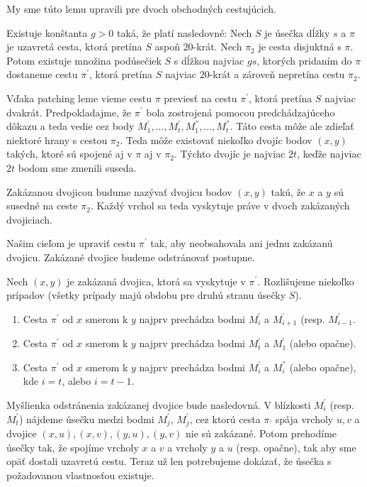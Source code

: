 My sme túto lemu upravili pre dvoch obchodných cestujúcich.

\begin{lema}
Existuje konštanta $g > 0$ taká, že platí nasledovné: Nech $S$ je úsečka dĺžky $s$ a $\pi$ je
uzavretá cesta, ktorá pretína $S$ aspoň $20$-krát. Nech $\pi_2$ je cesta disjuktná s $\pi$.
Potom existuje množina podúsečiek $S$ s dĺžkou najviac
$gs$, ktorých pridaním do $\pi$ dostaneme cestu $\pi^{'}$, ktorá pretína $S$ najviac $20$-krát a
zároveň nepretína cestu $\pi_2$.
\end{lema}

\begin{dokaz}
Vďaka patching leme vieme cestu $\pi$ previesť na cestu $\pi^{'}$, ktorá pretína $S$ najviac
dvakrát. Predpokladajme, že $\pi^{'}$ bola zostrojená pomocou predchádzajúceho dôkazu a teda vedie
cez body $M_1^{'}, \dots, M_t^{'}, M_1^{''}, \dots, M_t^{''}$. Táto cesta môže ale zdieľať niektoré
hrany s cestou $\pi_2$. Teda môže existovať niekoľko dvojíc bodov $(x, y)$ takých, ktoré sú spojené
aj v $\pi$ aj v $\pi_2$. Týchto dvojíc je najviac $2t$, keďže najviac $2t$ bodom sme zmenili suseda. 

Zakázanou dvojicou budume nazývať dvojicu bodov $(x, y)$ takú, že $x$ a $y$ sú susedné na
ceste $\pi_2$. Každý vrchol sa teda vyskytuje práve v dvoch zakázaných dvojiciach.

Našim cieľom je upraviť cestu $\pi^{'}$ tak, aby neobsahovala ani jednu zakázanú dvojicu.
Zakázané dvojice budeme odstránovať postupne.

Nech $(x,y)$ je zakázaná dvojica, ktorá sa vyskytuje v $\pi^{'}$. Rozlišujeme niekoľko prípadov
(všetky prípady majú obdobu pre druhú stranu úsečky $S$).
\begin{enumerate}
\item Cesta $\pi^{'}$ od $x$ smerom k $y$ najprv prechádza bodmi $M_i^{'}$ a $M_{i+1}^{'}$ (resp.
$M_{i-1}^{'}$.
\item Cesta $\pi^{'}$ od $x$ smerom k $y$ najprv prechádza bodmi $M_t^{'}$ a $M_{1}^{'}$ (alebo
opačne).
\item Cesta $\pi^{'}$ od $x$ smerom k $y$ najprv prechádza bodmi $M_i^{'}$ a $M_i^{''}$ (alebo
opačne), kde $i = t$, alebo $i = t-1$.
\end{enumerate}

Myšlienka odstránenia zakázanej dvojice bude nasledovná. V blízkosti $M_i^{'}$ (resp. $M_t^{'}$)
nájdeme úsečku medzi bodmi $M_j^{'}$, $M_j^{'}$, cez ktorú cesta $\pi_{'}$ spája vrcholy $u, v$
a dvojice $(x,u), (x,v), (y,u), (y,v)$ nie sú zakázané. Potom prehodíme úsečky tak, že spojíme
vrcholy $x$ a $v$ a vrcholy $y$ a $u$ (resp. opačne), tak aby sme opäť dostali uzavretú cestu.
Teraz už len potrebujeme dokázať, že úsečka s požadovanou vlastnosťou existuje.


\end{dokaz}
